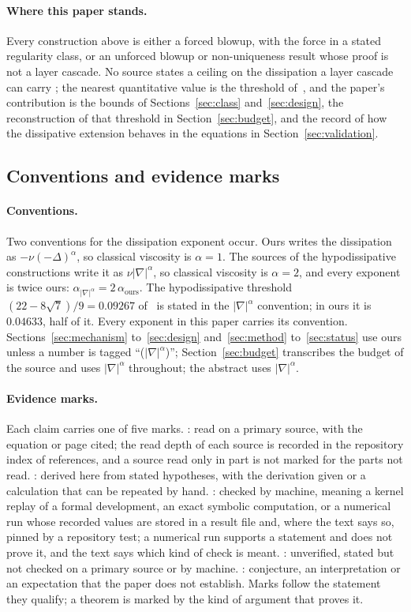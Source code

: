 \documentclass[11pt]{article}
\theoremstyle{remark}
\newcommand{\ev}[1]{\hspace{0.2em}{\small\textsf{[#1]}}}
\begin{document}
\paragraph{Where this paper stands.} Every construction above is either a forced blowup, with the force in a
stated regularity class, or an unforced blowup or non-uniqueness result whose proof is not a layer cascade.
No source states a ceiling on the dissipation a layer cascade can carry \ev{U}; the nearest quantitative
value is the threshold of~\cite{cmz}, and the paper's contribution is the bounds of Sections~\ref{sec:class}
and~\ref{sec:design}, the reconstruction of that threshold in Section~\ref{sec:budget}, and the record of how
the dissipative extension behaves in the equations in Section~\ref{sec:validation}.

\subsection{Conventions and evidence marks}

\paragraph{Conventions.} Two conventions for the dissipation exponent occur. Ours writes the
dissipation as $-\nu(-\Delta)^{\alpha}$, so classical viscosity is $\alpha=1$. The sources of the
hypodissipative constructions write it as $\nu|\nabla|^{\alpha}$, so classical viscosity is
$\alpha=2$, and every exponent is twice ours: $\alpha_{|\nabla|^{\alpha}}=2\,\alpha_{\mathrm{ours}}$.
The hypodissipative threshold $(22-8\sqrt7)/9=0.09267$ of~\cite{cmz} is stated in the
$|\nabla|^{\alpha}$ convention; in ours it is $0.04633$, half of it. Every exponent in this paper
carries its convention. Sections~\ref{sec:mechanism} to~\ref{sec:design} and~\ref{sec:method}
to~\ref{sec:status} use ours unless a number is tagged ``($|\nabla|^{\alpha}$)''; Section~\ref{sec:budget}
transcribes the budget of the source and uses $|\nabla|^{\alpha}$ throughout; the abstract uses
$|\nabla|^{\alpha}$.

\paragraph{Evidence marks.} Each claim carries one of five marks. \ev{V}: read on a primary source, with
the equation or page cited; the read depth of each source is recorded in the repository index of
references, and a source read only in part is not marked \ev{V} for the parts not read. \ev{D}: derived here
from stated hypotheses, with the derivation given or a calculation that can be repeated by hand.
\ev{MV}: checked by machine, meaning a kernel replay of a formal development, an exact symbolic
computation, or a numerical run whose recorded values are stored in a result file and, where the text says so, pinned by a repository test; a numerical run
supports a statement and does not prove it, and the text says which kind of check is meant.
\ev{U}: unverified, stated but not checked on a primary source or by machine. \ev{C}: conjecture, an
interpretation or an expectation that the paper does not establish. Marks follow the statement they
qualify; a theorem is marked by the kind of argument that proves it.
\end{document}
